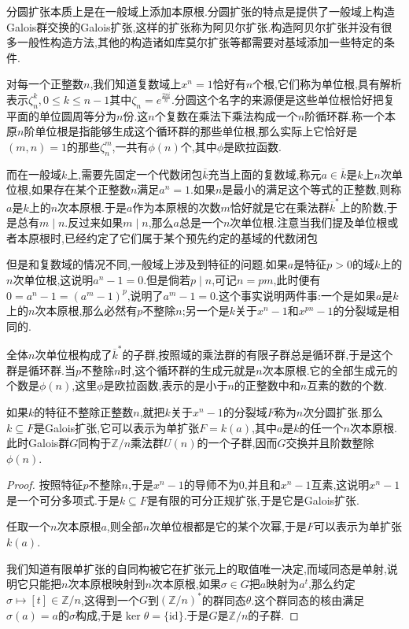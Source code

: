 分圆扩张本质上是在一般域上添加本原根.分圆扩张的特点是提供了一般域上构造Galois群交换的Galois扩张,这样的扩张称为阿贝尔扩张.构造阿贝尔扩张并没有很多一般性构造方法,其他的构造诸如库莫尔扩张等都需要对基域添加一些特定的条件.

对每一个正整数$n$,我们知道复数域上$x^n=1$恰好有$n$个根,它们称为单位根,具有解析表示$\zeta_{n}^k,0\le k\le n-1$其中$\zeta_{n}=e^{\frac{2\pi i}{n}}$.分圆这个名字的来源便是这些单位根恰好把复平面的单位圆周等分为$n$份.这$n$个复数在乘法下乘法构成一个$n$阶循环群.称一个本原$n$阶单位根是指能够生成这个循环群的那些单位根,那么实际上它恰好是$(m,n)=1$的那些$\zeta_n^m$,一共有$\phi(n)$个,其中$\phi$是欧拉函数.

而在一般域$k$上,需要先固定一个代数闭包$\overline{k}$充当上面的复数域,称元$a\in\overline{k}$是$k$上$n$次单位根,如果存在某个正整数$n$满足$a^n=1$.如果$n$是最小的满足这个等式的正整数,则称$a$是$k$上的$n$次本原根.于是$a$作为本原根的次数$m$恰好就是它在乘法群$\overline{k}^*$上的阶数,于是总有$m\mid n$.反过来如果$m\mid n$,那么$a$总是一个$n$次单位根.注意当我们提及单位根或者本原根时,已经约定了它们属于某个预先约定的基域的代数闭包

但是和复数域的情况不同,一般域上涉及到特征的问题.如果$a$是特征$p>0$的域$k$上的$n$次单位根,这说明$a^n-1=0$.但是倘若$p\mid n$,可记$n=pm$,此时便有$0=a^n-1=(a^m-1)^p$,说明了$a^m-1=0$.这个事实说明两件事:一个是如果$a$是$k$上的$n$次本原根,那么必然有$p$不整除$n$;另一个是$k$关于$x^n-1$和$x^{pn}-1$的分裂域是相同的.

全体$n$次单位根构成了$\overline{k}^*$的子群,按照域的乘法群的有限子群总是循环群,于是这个群是循环群.当$p$不整除$n$时,这个循环群的生成元就是$n$次本原根.它的全部生成元的个数是$\phi(n)$,这里$\phi$是欧拉函数,表示的是小于$n$的正整数中和$n$互素的数的个数.

如果$k$的特征不整除正整数$n$,就把$k$关于$x^n-1$的分裂域$F$称为$n$次分圆扩张.那么$k\subseteq F$是Galois扩张,它可以表示为单扩张$F=k(a)$,其中$a$是$k$的任一个$n$次本原根.此时Galois群$G$同构于$\mathbb{Z}/n$乘法群$U(n)$的一个子群,因而$G$交换并且阶数整除$\phi(n)$.
\begin{proof}
	
	按照特征$p$不整除$n$,于是$x^n-1$的导师不为0,并且和$x^n-1$互素,这说明$x^n-1$是一个可分多项式.于是$k\subseteq F$是有限的可分正规扩张,于是它是Galois扩张.
	
	任取一个$n$次本原根$a$,则全部$n$次单位根都是它的某个次幂,于是$F$可以表示为单扩张$k(a)$.
	
	我们知道有限单扩张的自同构被它在扩张元上的取值唯一决定,而域同态是单射,说明它只能把$n$次本原根映射到$n$次本原根,如果$\sigma\in G$把$a$映射为$a^t$,那么约定$\sigma\mapsto [t]\in\mathbb{Z}/n$,这得到一个$G$到$(\mathbb{Z}/n)^*$的群同态$\theta$.这个群同态的核由满足$\sigma(a)=a$的$\sigma$构成,于是$\ker\theta=\{\mathrm{id}\}$.于是$G$是$\mathbb{Z}/n$的子群.
\end{proof}

